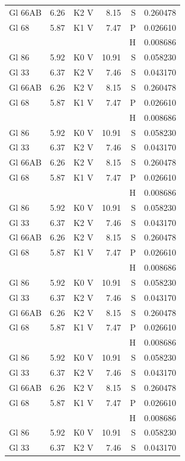 \documentclass{aa}
\begin{document}
{\begin{landscape}
\begin{longtable}{lllrrr}
Gl 66AB  & 6.26 & K2 V & 8.15 & S & 0.260478\\
Gl 68    & 5.87 & K1 V & 7.47 & P & 0.026610\\
         &      &      &      & H & 0.008686\\
Gl 86    & 5.92 & K0 V & 10.91& S & 0.058230\\   Gl 33    & 6.37 & K2 V & 7.46 & S & 0.043170\\
Gl 66AB  & 6.26 & K2 V & 8.15 & S & 0.260478\\
Gl 68    & 5.87 & K1 V & 7.47 & P & 0.026610\\
         &      &      &      & H & 0.008686\\
Gl 86    & 5.92 & K0 V & 10.91& S & 0.058230\\   Gl 33    & 6.37 & K2 V & 7.46 & S & 0.043170\\
Gl 66AB  & 6.26 & K2 V & 8.15 & S & 0.260478\\
Gl 68    & 5.87 & K1 V & 7.47 & P & 0.026610\\
         &      &      &      & H & 0.008686\\
Gl 86    & 5.92 & K0 V & 10.91& S & 0.058230\\   Gl 33    & 6.37 & K2 V & 7.46 & S & 0.043170\\
Gl 66AB  & 6.26 & K2 V & 8.15 & S & 0.260478\\
Gl 68    & 5.87 & K1 V & 7.47 & P & 0.026610\\
         &      &      &      & H & 0.008686\\
Gl 86    & 5.92 & K0 V & 10.91& S & 0.058230\\   Gl 33    & 6.37 & K2 V & 7.46 & S & 0.043170\\
Gl 66AB  & 6.26 & K2 V & 8.15 & S & 0.260478\\
Gl 68    & 5.87 & K1 V & 7.47 & P & 0.026610\\
         &      &      &      & H & 0.008686\\
Gl 86    & 5.92 & K0 V & 10.91& S & 0.058230\\   Gl 33    & 6.37 & K2 V & 7.46 & S & 0.043170\\
Gl 66AB  & 6.26 & K2 V & 8.15 & S & 0.260478\\
Gl 68    & 5.87 & K1 V & 7.47 & P & 0.026610\\
         &      &      &      & H & 0.008686\\
Gl 86    & 5.92 & K0 V & 10.91& S & 0.058230\\   Gl 33    & 6.37 & K2 V & 7.46 & S & 0.043170\\

\end{longtable}
\end{landscape}}
\end{document}
